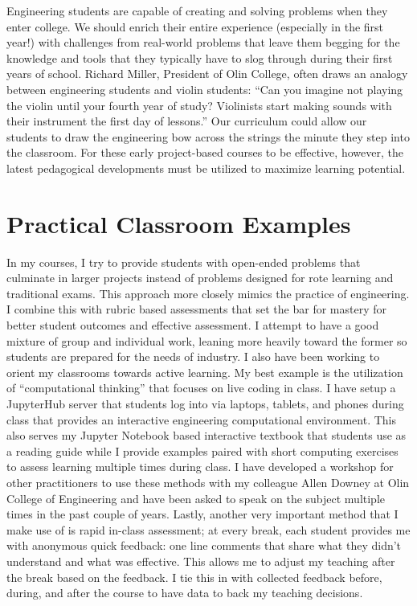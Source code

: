 \documentclass{article}
\begin{document}
Engineering students are capable of creating and solving problems when they
enter college. We should enrich their entire experience (especially in the first
year!) with challenges from real-world problems that leave them begging for the
knowledge and tools that they typically have to slog through during their first
years of school. Richard Miller, President of Olin College, often draws an
analogy between engineering students and violin students: ``Can you imagine not
playing the violin until your fourth year of study? Violinists start making
sounds with their instrument the first day of lessons.'' Our curriculum could
allow our students to draw the engineering bow across the strings the minute
they step into the classroom. For these early project-based courses to be
effective, however, the latest pedagogical developments must be utilized to
maximize learning potential.

\section*{Practical Classroom Examples}
%
In my courses, I try to provide students with open-ended problems that
culminate in larger projects instead of problems designed for rote learning and
traditional exams. This approach more closely mimics the practice of
engineering. I combine this with rubric based assessments that set the bar for
mastery for better student outcomes and effective assessment. I attempt to have
a good mixture of group and individual work, leaning more heavily toward the
former so students are prepared for the needs of industry. I also have been
working to orient my classrooms towards active learning. My best example is the
utilization of ``computational thinking'' that focuses on live coding in class.
I have setup a JupyterHub server that students log into via laptops, tablets,
and phones during class that provides an interactive engineering computational
environment. This also serves my Jupyter Notebook based interactive textbook
that students use as a reading guide while I provide examples paired with short
computing exercises to assess learning multiple times during class. I have
developed a workshop for other practitioners to use these methods with my
colleague Allen Downey at Olin College of Engineering and have been asked to
speak on the subject multiple times in the past couple of years. Lastly,
another very important method that I make use of is rapid in-class assessment;
at every break, each student provides me with anonymous quick feedback: one
line comments that share what they didn't understand and what was effective.
This allows me to adjust my teaching after the break based on the feedback. I
tie this in with collected feedback before, during, and after the course to
have data to back my teaching decisions.
\end{document}
